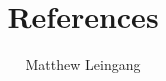 \documentclass{article}
\title{References}
\author{Matthew Leingang}
\begin{document}
\maketitle
\nocite{*}


\end{document}
